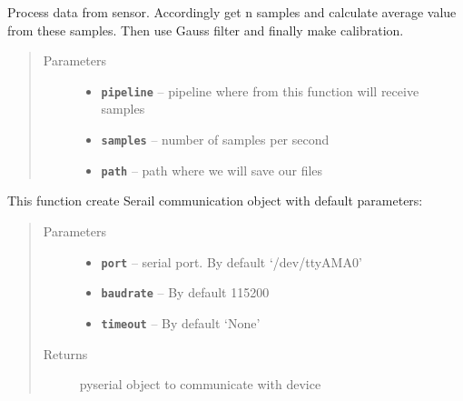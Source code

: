 \documentclass[12pt]{article}
\begin{document}
\label{index:module-processor}

\begin{fulllineitems}
\label{index:processor.process_data}
Process data from sensor. Accordingly get n samples and calculate average
value from these samples. Then use Gauss filter and finally make
calibration.
\begin{quote}\begin{description}
\item[{Parameters}] \leavevmode\begin{itemize}
\item {} 
\textbf{\texttt{pipeline}} -- pipeline where from this function will receive samples

\item {} 
\textbf{\texttt{samples}} -- number of samples per second

\item {} 
\textbf{\texttt{path}} -- path where we will save our files

\end{itemize}

\end{description}\end{quote}

\end{fulllineitems}

\label{index:module-reader}

\begin{fulllineitems}
\label{index:reader.init_communication}
This function create Serail communication object with default parameters:
\begin{quote}\begin{description}
\item[{Parameters}] \leavevmode\begin{itemize}
\item {} 
\textbf{\texttt{port}} -- serial port. By default `/dev/ttyAMA0'

\item {} 
\textbf{\texttt{baudrate}} -- By default 115200

\item {} 
\textbf{\texttt{timeout}} -- By default `None'

\end{itemize}

\item[{Returns}] \leavevmode
pyserial object to communicate with device

\end{description}\end{quote}

\end{fulllineitems}
\end{document}
